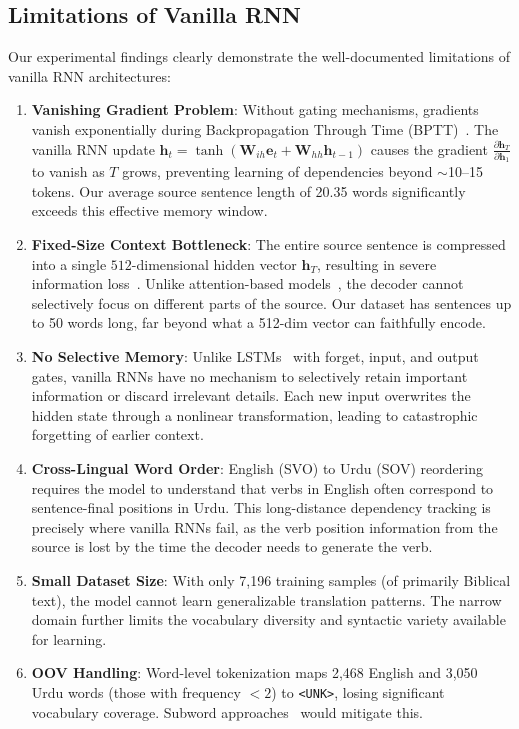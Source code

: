 \documentclass[runningheads]{llncs}
\begin{document}
\subsection{Limitations of Vanilla RNN}

Our experimental findings clearly demonstrate the well-documented limitations of vanilla RNN architectures:

\begin{enumerate}
    \item \textbf{Vanishing Gradient Problem}: Without gating mechanisms, gradients vanish exponentially during Backpropagation Through Time (BPTT)~\cite{bengio1994learning}. The vanilla RNN update $\mathbf{h}_t = \tanh(\mathbf{W}_{ih}\mathbf{e}_t + \mathbf{W}_{hh}\mathbf{h}_{t-1})$ causes the gradient $\frac{\partial \mathbf{h}_T}{\partial \mathbf{h}_1}$ to vanish as $T$ grows, preventing learning of dependencies beyond $\sim$10--15 tokens. Our average source sentence length of 20.35 words significantly exceeds this effective memory window.
    
    \item \textbf{Fixed-Size Context Bottleneck}: The entire source sentence is compressed into a single $512$-dimensional hidden vector $\mathbf{h}_T$, resulting in severe information loss~\cite{cho2014properties}. Unlike attention-based models~\cite{bahdanau2015neural}, the decoder cannot selectively focus on different parts of the source. Our dataset has sentences up to 50 words long, far beyond what a 512-dim vector can faithfully encode.
    
    \item \textbf{No Selective Memory}: Unlike LSTMs~\cite{hochreiter1997long} with forget, input, and output gates, vanilla RNNs have no mechanism to selectively retain important information or discard irrelevant details. Each new input overwrites the hidden state through a nonlinear transformation, leading to catastrophic forgetting of earlier context.
    
    \item \textbf{Cross-Lingual Word Order}: English (SVO) to Urdu (SOV) reordering requires the model to understand that verbs in English often correspond to sentence-final positions in Urdu. This long-distance dependency tracking is precisely where vanilla RNNs fail, as the verb position information from the source is lost by the time the decoder needs to generate the verb.
    
    \item \textbf{Small Dataset Size}: With only 7,196 training samples (of primarily Biblical text), the model cannot learn generalizable translation patterns. The narrow domain further limits the vocabulary diversity and syntactic variety available for learning.
    
    \item \textbf{OOV Handling}: Word-level tokenization maps 2,468 English and 3,050 Urdu words (those with frequency $<2$) to \texttt{<UNK>}, losing significant vocabulary coverage. Subword approaches~\cite{sennrich2016neural} would mitigate this.
\end{enumerate}
\end{document}
